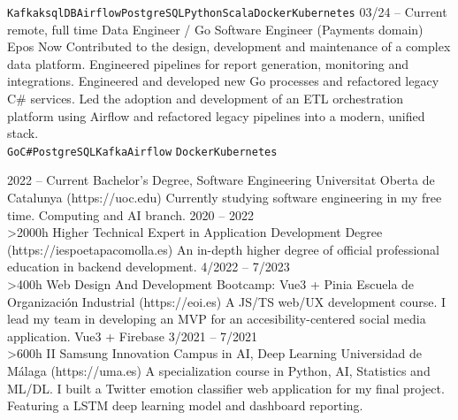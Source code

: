 \documentclass[10pt]{developercv} %
\begin{document}
\begin{entrylist}
{		\texttt{Kafka}\slashsep\texttt{ksqlDB}\slashsep\texttt{Airflow}\slashsep\texttt{PostgreSQL}\slashsep\texttt{Python}\slashsep\texttt{Scala}\slashsep\texttt{Docker}\slashsep\texttt{Kubernetes}}
	\entry
		{03/24 -- Current\\\footnotesize{remote, full time}}
		{Data Engineer / Go Software Engineer (Payments domain)}
		{Epos Now}
		{
			Contributed to the design, development and maintenance of a complex data platform.
			Engineered pipelines for report generation, monitoring and integrations. Engineered and developed new Go processes and refactored legacy C\# services.
			Led the adoption and development of an ETL orchestration platform using Airflow and refactored legacy pipelines into a modern, unified stack.
			\\
		\texttt{Go}\slashsep\texttt{C\#}\slashsep\texttt{PostgreSQL}\slashsep\texttt{Kafka}\slashsep\texttt{Airflow}
		\slashsep\texttt{Docker}\slashsep\texttt{Kubernetes}}
\end{entrylist}



\begin{entrylist}
	\entry
		{2022 -- Current}
		{Bachelor's Degree, Software Engineering}
		{Universitat Oberta de Catalunya (https://uoc.edu)}
		{Currently studying software engineering in my free time. Computing and AI branch.}
	\entry
		{2020 -- 2022\\\footnotesize{>2000h}}
		{Higher Technical Expert in Application Development Degree}
		{(https://iespoetapacomolla.es)}
		{An in-depth higher degree of official professional education in backend development.}
	\entry
	{4/2022 -- 7/2023\\\footnotesize{>400h}}
	{Web Design And Development Bootcamp: Vue3 + Pinia}
	{Escuela de Organización Industrial (https://eoi.es)}
	{A JS/TS web/UX development course. I lead my team in developing an MVP for an accesibility-centered social media application. Vue3 + Firebase}
	\entry
		{3/2021 -- 7/2021\\\footnotesize{>600h}}
		{II Samsung Innovation Campus in AI, Deep Learning}
		{Universidad de Málaga (https://uma.es)}
		{A specialization course in Python, AI, Statistics and ML/DL. I built a Twitter emotion classifier web application for my final project. Featuring a LSTM deep learning model and dashboard reporting.}
\end{entrylist}
\end{document}
